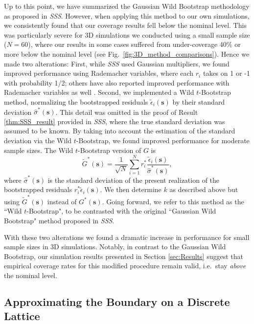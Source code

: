 Up to this point, we have summarized the Gaussian Wild Bootstrap methodology as proposed in \textit{SSS}. However, when applying this method to our own simulations, we consistently found that our coverage results fell below the nominal level.  This was particularly severe for 3D simulations we conducted using a small sample size ($N = 60$), where our results in some cases suffered from under-coverage 40\% or more below the nominal level (see Fig.\ \ref{fig:3D_method_comparisons}). Hence we made two alterations: First, while \textit{SSS} used Gaussian multipliers, we found improved performance using Rademacher variables, where each $r_i$ takes on 1 or -1 with  probability 1/2; others have also reported improved performance with Rademacher variables as well \citep{Davidson2008-qh}. Second, we implemented a Wild $t$-Bootstrap \citep{Telschow2019-lg} method, normalizing the bootstrapped residuals $\tilde{\epsilon}_{i}(\bm{s})$ by their standard deviation $\hat{\sigma}^*(\bm{s})$. This detail was omitted in the proof of Result \ref{thm:SSS_result} provided in \textit{SSS}, where the true standard deviation was assumed to be known. By taking into account the estimation of the standard deviation via the Wild $t$-Bootstrap, we found improved performance for moderate sample sizes. The Wild $t$-Bootstrap version of $G$ is
\begin{equation}
\label{eq:wild_bootstrap_G}
\tilde{G}^{*}(\bm{s}) = \frac{1}{\sqrt{N}}\sum_{i=1}^{N} r^*_i\frac{\tilde{\epsilon}_{i}(\bm{s})}{\hat{\sigma}^*(\bm{s})},
\end{equation}
 where $\hat{\sigma}^{*}(\bm{s})$ is the standard deviation of the present realization of the bootstrapped residuals $r^*_i\tilde{\epsilon}_{i}(\bm{s})$. We then determine $k$ as described above but using $\tilde{G}^{*}(\bm{s})$ instead of $G^*(\bm{s})$. Going forward, we refer to this method as the ``Wild $t$-Bootstrap", to be contrasted with the original ``Gaussian Wild Bootstrap" method proposed in \textit{SSS}.

With these two alterations we found a dramatic increase in performance for small sample sizes in 3D simulations. 
Notably, in contrast to the Gaussian Wild Bootstrap, our simulation results presented in Section \ref{sec:Results} suggest that empirical coverage rates for this modified procedure remain valid, i.e.~stay \textit{above} the nominal level.  

\subsection{Approximating the Boundary on a Discrete Lattice}
\label{sec:boundary_discrete_lattice}


